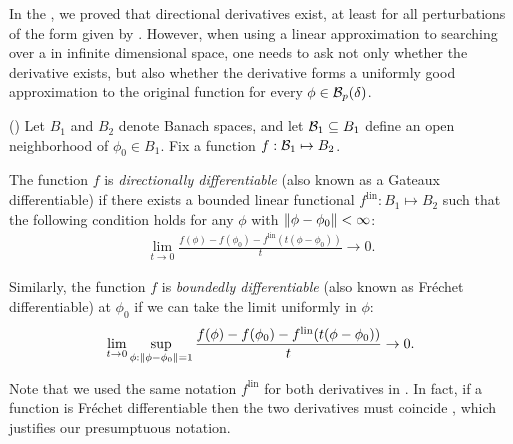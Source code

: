 
In the , we proved that directional derivatives exist, at
least for all perturbations of the form given by .
However, when using a linear approximation to searching over a in infinite
dimensional space, one needs to ask not only whether the derivative exists, but
also whether the derivative forms a uniformly good approximation to the original
function for every $\phi \in \mathcal{B}_p(\delta)$.

\begin{defn}
    (\citep[Definition 4.5]{zeidler:2013:functional})
%
Let $B_1$ and $B_2$ denote Banach spaces, and let $\mathcal{B}_1 \subseteq B_1$ define
an open neighborhood of $\phi_0 \in B_1$.  Fix a function $f: \mathcal{B}_1
\mapsto B_2$.

The function $f$ is {\em directionally differentiable} (also known as a Gateaux
differentiable) if there exists a bounded linear functional $f^{\mathrm{lin}}:
B_1 \mapsto B_2$ such that the following condition holds for any
$\phi$ with $\left\Vert\phi - \phi_0\right\Vert < \infty$:
%
\begin{align*}
%
\lim_{t \rightarrow 0}
    \frac{f(\phi) - f(\phi_0) -
          f^{\mathrm{lin}}(t (\phi - \phi_0) )
         }{t} \rightarrow 0.
%
\end{align*}
%

Similarly, the function $f$ is {\em boundedly differentiable} (also known as
Fr{\'echet} differentiable) at $\phi_0$ if we can take the limit uniformly in
$\phi$:
%
\begin{align*}
%
\lim_{t \rightarrow 0}
    \sup_{\phi: \norm{\phi - \phi_0} = 1}
    \frac{f(\phi) - f(\phi_0) -
          f^{\mathrm{lin}}(t (\phi - \phi_0))
         }{t} \rightarrow 0.
%
\end{align*}
%
\end{defn}

Note that we used the same notation $f^{\mathrm{lin}}$ for both derivatives in
.  In fact, if a function is Fr{\'e}chet differentiable
then the two derivatives must coincide \citep[Proposition
4.8]{zeidler:2013:functional}, which justifies our presumptuous notation.

